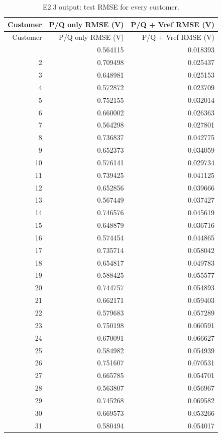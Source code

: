 \documentclass[11pt,a4paper]{article}
\begin{document}
\begin{longtable}{rrr}
\caption{E2.3 output: test RMSE for every customer.}\\
\toprule Customer & P/Q only RMSE (V) & P/Q + Vref RMSE (V) \\ \midrule
\endfirsthead
\toprule Customer & P/Q only RMSE (V) & P/Q + Vref RMSE (V) \\ \midrule
\endhead
\bottomrule\endfoot
1 & 0.564115 & 0.018393 \\
2 & 0.709498 & 0.025437 \\
3 & 0.648981 & 0.025153 \\
4 & 0.572872 & 0.023709 \\
5 & 0.752155 & 0.032014 \\
6 & 0.660002 & 0.026363 \\
7 & 0.564298 & 0.027801 \\
8 & 0.736837 & 0.042775 \\
9 & 0.652373 & 0.034059 \\
10 & 0.576141 & 0.029734 \\
11 & 0.739425 & 0.041125 \\
12 & 0.652856 & 0.039666 \\
13 & 0.567449 & 0.037427 \\
14 & 0.746576 & 0.045619 \\
15 & 0.648879 & 0.036716 \\
16 & 0.574454 & 0.044865 \\
17 & 0.735714 & 0.058042 \\
18 & 0.654817 & 0.049783 \\
19 & 0.588425 & 0.055577 \\
20 & 0.744757 & 0.054893 \\
21 & 0.662171 & 0.059403 \\
22 & 0.579683 & 0.057289 \\
23 & 0.750198 & 0.060591 \\
24 & 0.670091 & 0.066627 \\
25 & 0.584982 & 0.054939 \\
26 & 0.751607 & 0.070531 \\
27 & 0.665785 & 0.054701 \\
28 & 0.563807 & 0.056967 \\
29 & 0.745268 & 0.069582 \\
30 & 0.669573 & 0.053266 \\
31 & 0.580494 & 0.054017 \\
\end{longtable}
\end{document}
